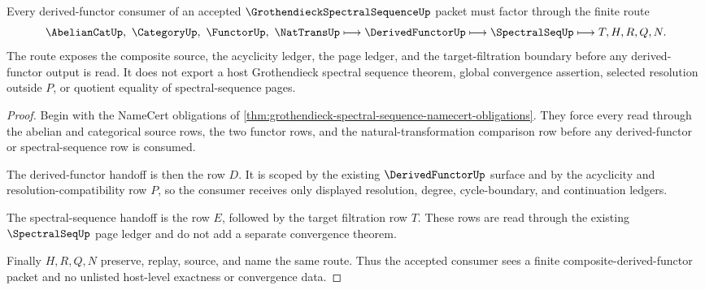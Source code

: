 \begin{theorem}
\label{thm:grothendieck-spectral-sequence-derived-functor-route}
Every derived-functor consumer of an accepted $\GrothendieckSpectralSequenceUp$ packet must factor through the finite route
$$
\AbelianCatUp,\ \CategoryUp,\ \FunctorUp,\ \NatTransUp
\longmapsto \DerivedFunctorUp
\longmapsto \SpectralSeqUp
\longmapsto T,H,R,Q,N .
$$
The route exposes the composite source, the acyclicity ledger, the page ledger, and the target-filtration boundary before any derived-functor output is read. It does not export a host Grothendieck spectral sequence theorem, global convergence assertion, selected resolution outside $P$, or quotient equality of spectral-sequence pages.
\end{theorem}
\begin{proof}
Begin with the NameCert obligations of \autoref{thm:grothendieck-spectral-sequence-namecert-obligations}. They force every read through the abelian and categorical source rows, the two functor rows, and the natural-transformation comparison row before any derived-functor or spectral-sequence row is consumed.

The derived-functor handoff is then the row $D$. It is scoped by the existing $\DerivedFunctorUp$ surface and by the acyclicity and resolution-compatibility row $P$, so the consumer receives only displayed resolution, degree, cycle-boundary, and continuation ledgers.

The spectral-sequence handoff is the row $E$, followed by the target filtration row $T$. These rows are read through the existing $\SpectralSeqUp$ page ledger and do not add a separate convergence theorem.

Finally $H,R,Q,N$ preserve, replay, source, and name the same route. Thus the accepted consumer sees a finite composite-derived-functor packet and no unlisted host-level exactness or convergence data.
\end{proof}




